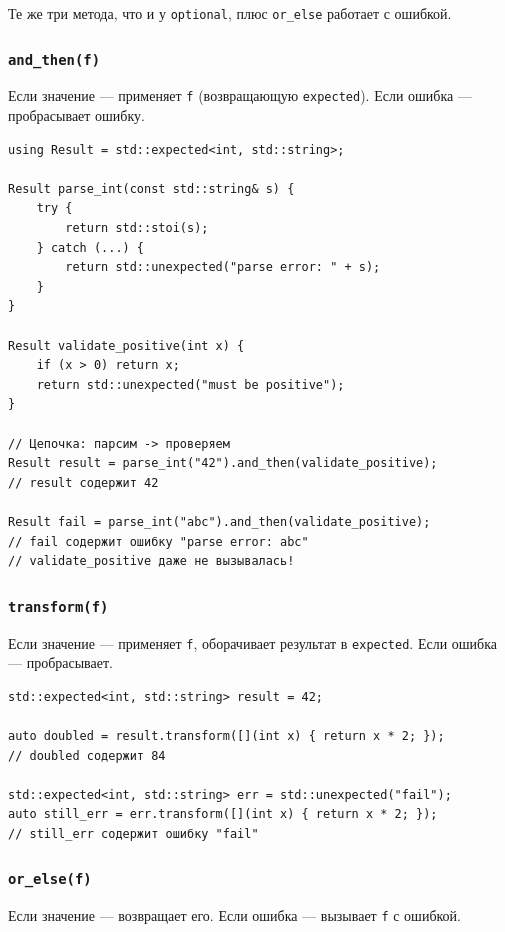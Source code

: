 \documentclass[a4paper,12pt]{article}
\begin{document}
Те же три метода, что и у \texttt{optional}, плюс \texttt{or\_else} работает
с ошибкой.

\subsubsection{\texttt{and\_then(f)}}

Если значение --- применяет \texttt{f} (возвращающую \texttt{expected}).
Если ошибка --- пробрасывает ошибку.

\begin{lstlisting}
using Result = std::expected<int, std::string>;

Result parse_int(const std::string& s) {
    try {
        return std::stoi(s);
    } catch (...) {
        return std::unexpected("parse error: " + s);
    }
}

Result validate_positive(int x) {
    if (x > 0) return x;
    return std::unexpected("must be positive");
}

// Цепочка: парсим -> проверяем
Result result = parse_int("42").and_then(validate_positive);
// result содержит 42

Result fail = parse_int("abc").and_then(validate_positive);
// fail содержит ошибку "parse error: abc"
// validate_positive даже не вызывалась!
\end{lstlisting}

\subsubsection{\texttt{transform(f)}}

Если значение --- применяет \texttt{f}, оборачивает результат в \texttt{expected}.
Если ошибка --- пробрасывает.

\begin{lstlisting}
std::expected<int, std::string> result = 42;

auto doubled = result.transform([](int x) { return x * 2; });
// doubled содержит 84

std::expected<int, std::string> err = std::unexpected("fail");
auto still_err = err.transform([](int x) { return x * 2; });
// still_err содержит ошибку "fail"
\end{lstlisting}

\subsubsection{\texttt{or\_else(f)}}

Если значение --- возвращает его. Если ошибка --- вызывает \texttt{f} с ошибкой.
\end{document}
